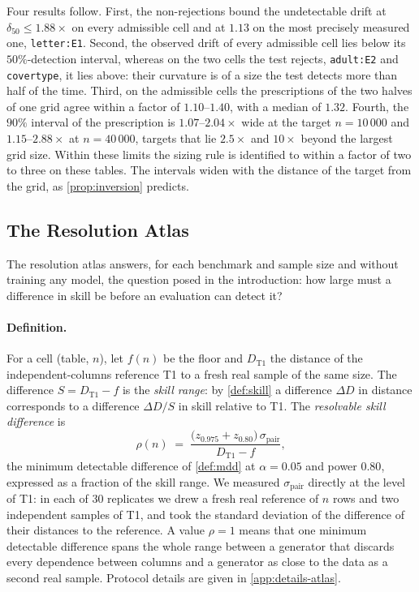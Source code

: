 \documentclass[twoside,11pt]{article}
\theoremstyle{plain}
\theoremstyle{definition}
\theoremstyle{remark}
\begin{document}
Four results follow. First, the non-rejections bound the undetectable drift
at $\delta_{50} \leq 1.88\times$ on every admissible cell and at $1.13$ on the
most precisely measured one, \texttt{letter:E1}. Second, the observed drift
of every admissible cell lies below its $50\%$-detection interval, whereas on
the two cells the test rejects, \texttt{adult:E2} and \texttt{covertype}, it
lies above: their curvature is of a size the test detects more than half of
the time. Third, on the admissible cells the prescriptions of the two halves
of one grid agree within a factor of $1.10$--$1.40$, with a median of
$1.32$. Fourth, the $90\%$ interval of the prescription is
$1.07$--$2.04\times$ wide at the target $n = 10\,000$ and
$1.15$--$2.88\times$ at $n = 40\,000$, targets that lie $2.5\times$ and
$10\times$ beyond the largest grid size. Within these limits the sizing
rule is identified to within a factor of two to three on these tables. The
intervals widen with the distance of the target from the grid, as
\cref{prop:inversion} predicts.

\subsection{The Resolution Atlas}\label{sec:empirical-atlas}

The resolution atlas answers, for each benchmark and sample size and
without training any model, the question posed in the introduction: how
large must a difference in skill be before an evaluation can detect it?

\paragraph{Definition.} For a cell (table, $n$), let $f(n)$ be the floor
and $D_{\mathrm{T1}}$ the distance of the independent-columns reference T1
to a fresh real sample of the same size. The difference
$S = D_{\mathrm{T1}} - f$ is the \emph{skill range}: by \cref{def:skill} a
difference $\Delta D$ in distance corresponds to a difference $\Delta D / S$
in skill relative to T1. The \emph{resolvable skill difference} is
\begin{equation}\label{eq:atlas}
  \rho(n) \;=\; \frac{\bigl(z_{0.975} + z_{0.80}\bigr)\,
  \sigma_{\mathrm{pair}}}{D_{\mathrm{T1}} - f},
\end{equation}
the minimum detectable difference of \cref{def:mdd} at $\alpha = 0.05$ and
power $0.80$, expressed as a fraction of the skill range. We measured
$\sigma_{\mathrm{pair}}$ directly at the level of T1: in each of $30$
replicates we drew a fresh real reference of $n$ rows and two independent
samples of T1, and took the standard deviation of the difference of their
distances to the reference. A value $\rho = 1$ means that one minimum
detectable difference spans the whole range between a generator that
discards every dependence between columns and a generator as close to the
data as a second real sample. Protocol details are given in
\cref{app:details-atlas}.
\end{document}
